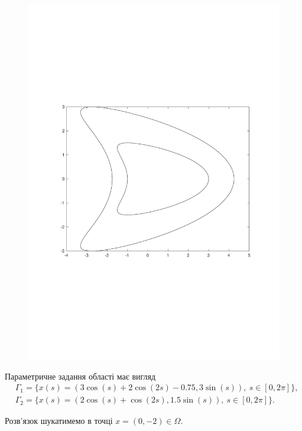 \documentclass[12pt]{report}
\begin{document}
\begin{figure}[h!]
\centering
	\vspace*{-4cm}
	\includegraphics[scale=.5]{sample2.pdf}
	\vspace*{-4cm}
\end{figure}

 Параметричне задання області має вигляд
  \begin{equation*}
 \begin{split}
 	&\Gamma_1= \{x(s)=(3\cos(s) + 2\cos(2s) - 0.75, 3\sin(s)),\ s\in[0,2\pi]\},\\
	&\Gamma_2= \{x(s)=(2\cos(s)+\cos(2s),1.5\sin(s)),\ s\in[0,2\pi]\}.
 \end{split}
 \end{equation*}
 
 Розв'язок шукатимемо в точці $x=(0, -2)\in \Omega$.
 
\end{document}
